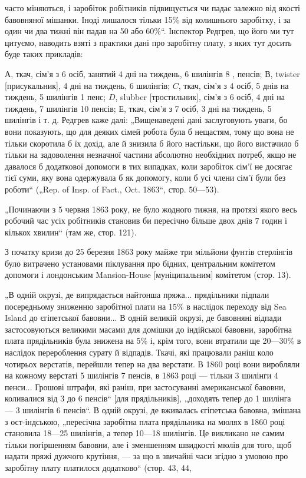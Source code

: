 \parcont{}  %
часто міняються, і заробіток робітників підвищується чи падає
залежно від якості бавовняної мішанки. Іноді лишалося тільки
15\% від колишнього заробітку, і за один чи два тижні він
падав на 50 або 60\%“. Інспектор Редгрев, що його ми тут
цитуємо, наводить взяті з практики дані про заробітну плату,
з яких тут досить буде таких прикладів:

$А$, ткач, сім’я з 6 осіб, занятий 4 дні на тиждень, 6 шилінгів
8 , пенсів; $В$, twister [присукальник], 4  дні на тиждень, 6 шилінгів;
$C$, ткач, сім’я з 4 осіб, 5 днів на тиждень, 5 шилінгів
1 пенс; $D$, slubber [тростильник], сім’я з 6 осіб, 4 дні на тиждень,
7 шилінгів 10 пенсів; $Е$, ткач, сім’я з 7 осіб, 3 дні на
тиждень, 5 шилінгів і т. д. Редгрев каже далі: „Вищенаведені
дані заслуговують уваги, бо вони показують, що для деяких
сімей робота була б нещастям, тому що вона не тільки скоротила
б їх дохід, але й знизила б його настільки, що його вистачило
б тільки на задоволення незначної частини абсолютно
необхідних потреб, якщо не давалося б додаткової допомоги
в тих випадках, коли заробіток сім’ї не досягає тієї суми, яку
вона одержувала б як допомогу, коли б усі члени сім’ї були
без роботи“ („Rep. of Insp. of Fact., Oct. 1863“, стор. 50—53).

„Починаючи з 5 червня 1863 року, не було жодного тижня,
на протязі якого весь робочий час усіх робітників становив би
пересічно більше двох днів 7 годин і кількох хвилин“ (там же,
стор. 121).

З початку кризи до 25 березня 1863 року майже три мільйони
фунтів стерлінгів було витрачено установами піклування
про бідних, центральним комітетом допомоги і лондонським
Mansion-House [муніципальним] комітетом (стор. 13).

„В одній окрузі, де випрядається найтонша пряжа... прядільники
підпали посередньому зниженню заробітної плати на 15\%
в наслідок переходу від Sea Island до єгіпетської бавовни...
В одній великій окрузі, де бавовняні відпади застосовуються
великими масами для домішки до індійської бавовни, заробітна
плата прядільників була знижена на 5\% і, крім того, вони
втратили ще 20—30\% в наслідок перероблення сурату й відпадів.
Ткачі, які працювали раніш коло чотирьох верстатів, перейшли
тепер на два верстати. В 1860 році вони виробляли на кожному
верстаті 5 шилінгів 7 пенсів, в 1863 році — тільки 3 шилінги
4 пенси... Грошові штрафи, які раніш, при застосуванні американської
бавовни, коливалися від 3 до 6 пенсів“ [для прядільників],
„доходять тепер до 1 шилінга — 3 шилінгів 6 пенсів“.
В одній окрузі, де вживалась єгіпетська бавовна, змішана
з ост-індською, „пересічна заробітна плата прядільника на мюлях
в 1860 році становила 18—25 шилінгів, а тепер 10—18 шилінгів.
Це викликано не самим тільки погіршенням бавовни,
але і зменшенням швидкості мюлів для того, щоб надати
пряжі дужчого крутіння, — за що в звичайні часи згідно з умовою
про заробітну плату платилося додатково“ (стор. 43, 44,
\parbreak{}  %
